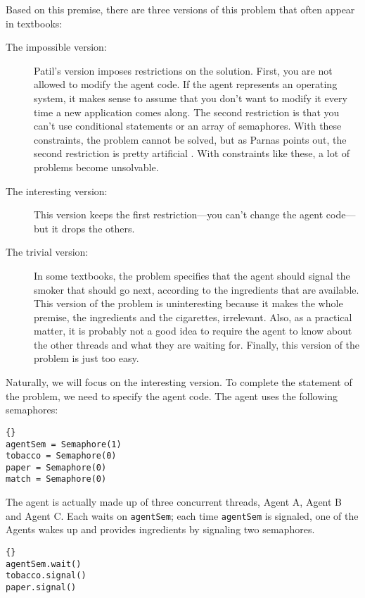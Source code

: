 \documentclass{book}
\begin{document}
Based on this premise, there are three versions of this problem
that often appear in textbooks:

\begin{description}

\item[The impossible version:] Patil's version imposes restrictions on
the solution.  First, you are not allowed to modify the agent code.
If the agent represents an operating system, it makes sense to assume
that you don't want to modify it every time a new application comes
along.  The second restriction is that you can't use conditional
statements or an array of semaphores.  With these constraints, the
problem cannot be solved, but as Parnas points out, the second
restriction is pretty artificial \cite{Parnas}.  With constraints like
these, a lot of problems become unsolvable.

\item[The interesting version:] This version keeps the first
restriction---you can't change the agent code---but it drops the others.

\item[The trivial version:] In some textbooks, the problem specifies
that the agent should signal the smoker that should go next, according
to the ingredients that are available.  This version of the problem
is uninteresting because it makes the whole premise, the ingredients
and the cigarettes, irrelevant.  Also, as a practical matter, it is
probably not a good idea to require the agent to know about the other
threads and what they are waiting for.  Finally, this version of
the problem is just too easy.

\end{description}

Naturally, we will focus on the interesting version.  To complete
the statement of the problem, we need to specify the agent code.
The agent uses the following semaphores:

\begin{lstlisting}[title={Agent semaphores}]{}
agentSem = Semaphore(1)
tobacco = Semaphore(0)
paper = Semaphore(0)
match = Semaphore(0)
\end{lstlisting}

The agent is actually made up of three concurrent
threads, Agent A, Agent B and Agent C.  Each waits on
{\tt agentSem}; each time {\tt agentSem} is signaled,
one of the Agents wakes up and provides ingredients by
signaling two semaphores.

\begin{lstlisting}[title={Agent A code}]{}
agentSem.wait()
tobacco.signal()
paper.signal()
\end{lstlisting}
\end{document}

